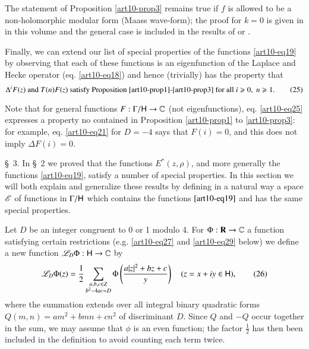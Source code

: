The statement of Proposition \ref{art10-prop3} remains true if $f$ is allowed to be a non-holomorphic modular form (Maass wave-form); the proof for $k=0$ is given in \cite{art10-12} in this volume and the general case is included in the results of \cite{art10-1} or \cite{art10-4}.

Finally, we can extend our list of special properties of the functions \eqref{art10-eq19} by observing that each of these functions is an eigenfunction of the Laplace and Hecke operator (eq. \eqref{art10-eq18}) and hence (trivially) has the property that
\begin{equation*}
\Delta^i F (z) \text{ and } T (n) F (z) \text{ satisfy Proposition \ref{art10-prop1}-\ref{art10-prop3} for all } i \geqslant 0, \; n \geqslant 1. \tag{25}\label{art10-eq25}
\end{equation*}

Note that for general functions $F: \Gamma / \mathsf{H} \to \mathbb{C}$ (not eigenfunctions), eq. \eqref{art10-eq25} expresses a property no contained in Proposition \ref{art10-prop1} to \ref{art10-prop3}: for example, eq. \eqref{art10-eq21} for $D = - 4$ says that $F (i) =0$, and this does not imply $\Delta F(i) =0$.

\S~3. In \S~2 we proved that the functions $E^\ast (z, \rho)$, and more generally the functions \eqref{art10-eq19}, satisfy a number of special properties. In this section we will both explain and generalize these results by defining in a natural way a space $\mathscr{E}$ of functions in $\Gamma / \mathsf{H}$ which contains the functions $\eqref{art10-eq19}$ and has the same special properties. 

Let $D$ be an integer congruent to 0 or 1 modulo 4. For $\Phi: \mathbf{R} \to \mathbb{C}$ a function satisfying certain restrictions (e.g. \eqref{art10-eq27} and \eqref{art10-eq29} below) we define a new function $\mathscr{L}_D \Phi: \mathsf{H} \to \mathbb{C}$ by
\begin{equation*}
\mathscr{L}_D \Phi (z) = \frac{1}{2} \sum\limits_{\substack{a, b, c \in Z\\ b^2- 4 a c = D}} \Phi \left(\frac{a|z|^2 + b z +c}{y} \right) \quad (z = x + iy \in \mathsf{H}), \tag{26}\label{art10-eq26}
\end{equation*}\pageoriginale
where the summation extends over all integral binary quadratic forms $Q(m,n) = am^2 + bmn + cn^2$ of discriminant $D$. Since $Q$ and $-Q$ occur together in the sum, we may assume that $\phi$ is an even function; the factor $\frac{1}{2}$ has then been included in the definition to avoid counting each term twice. 

